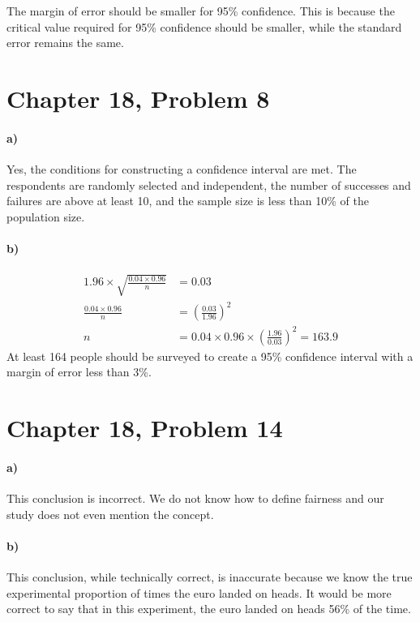\documentclass[12pt]{article}
\begin{document}
The margin of error should be smaller for 95\% confidence. This is because the critical value required
for 95\% confidence should be smaller, while the standard error remains the same.

\section*{Chapter 18, Problem 8}

\paragraph{a)}

Yes, the conditions for constructing a confidence interval are met. The respondents are randomly
selected and independent, the number of successes and failures are above at least 10, and the sample size
is less than 10\% of the population size.

\paragraph{b)}

\begin{align*}
    1.96\times\sqrt{\frac{0.04\times0.96}{n}}&=0.03\\
    \frac{0.04\times0.96}{n}&=\left(\frac{0.03}{1.96}\right)^2\\
    n&=0.04\times0.96\times\left(\frac{1.96}{0.03}\right)^2=163.9
\end{align*}
At least 164 people should be surveyed to create a 95\% confidence interval with a margin of error less than
3\%.

\section*{Chapter 18, Problem 14}

\paragraph{a)}

This conclusion is incorrect. We do not know how to define fairness and our study does not even mention the
concept.

\paragraph{b)}

This conclusion, while technically correct, is inaccurate because we know the true experimental proportion
of times the euro landed on heads. It would be more correct to say that in this experiment, the euro landed
on heads 56\% of the time.
\end{document}

